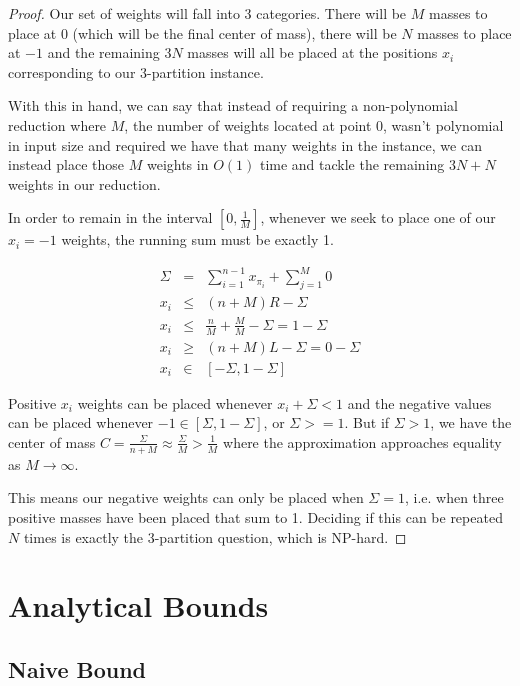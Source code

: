 \documentclass[11pt,twocolumn]{article}
\begin{document}
\begin{proof}
Our set of weights will fall into 3 categories.  There will be $M$ masses to place at 0 (which will be the final center of mass), there will be $N$ masses to place at $-1$ and the remaining $3N$ masses will all be placed at the positions $x_i$ corresponding to our 3-partition instance.

With this in hand, we can say that instead of requiring a non-polynomial reduction where $M$, the number of weights located at point 0, wasn't polynomial in input size and required we have that many weights in the instance, we can instead place those $M$ weights in $ O(1) $ time and tackle the remaining $ 3N + N$ weights in our reduction.

In order to remain in the interval $[0, \frac{1}{M}]$, whenever we seek to place one of our $x_i = -1$ weights, the running sum must be exactly 1.

\begin{eqnarray*}
\Sigma &=& \sum_{i=1}^{n-1} x_{\pi_i} + \sum_{j=1}^M 0 \\
x_i &\leq& (n+M) R - \Sigma \\
x_i &\leq& \frac{n}{M} + \frac{M}{M}- \Sigma = 1 - \Sigma \\
x_i &\geq& (n+M) L - \Sigma = 0 - \Sigma \\
x_i &\in& [ - \Sigma, 1 - \Sigma ]
\end{eqnarray*}

Positive $x_i$ weights can be placed whenever $x_i + \Sigma < 1$ and the negative values can be placed whenever $ -1 \in [\Sigma, 1-\Sigma] $, or $ \Sigma >= 1$.  But if $ \Sigma > 1$, we have the center of mass $ C = \frac{\Sigma}{n+M} \approx \frac{\Sigma}{M} > \frac{1}{M}$ where the approximation approaches equality as $ M \rightarrow \infty$.

This means our negative weights can only be placed when $\Sigma = 1$, i.e. when three positive masses have been placed that sum to 1.  Deciding if this can be repeated $N$ times is exactly the 3-partition question, which is NP-hard.
\end{proof}

\section{Analytical Bounds}

\subsection{Naive Bound}
\end{document}
